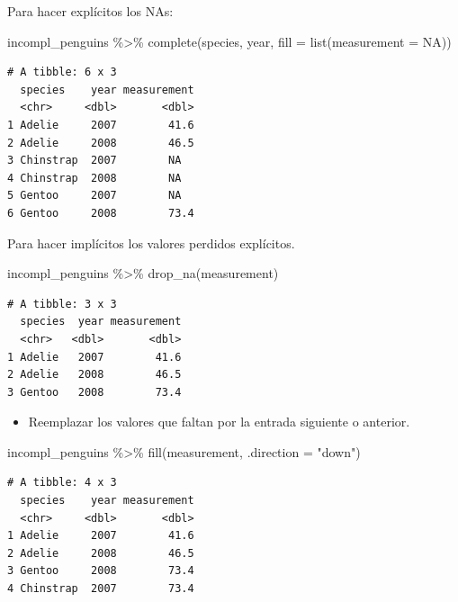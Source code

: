\documentclass[
  letterpaper,
  DIV=11,
  numbers=noendperiod]{scrreprt}
\newenvironment{Shaded}{\begin{snugshade}}{\end{snugshade}}
\newcommand{\AttributeTok}[1]{\textcolor[rgb]{0.40,0.45,0.13}{#1}}
\newcommand{\ConstantTok}[1]{\textcolor[rgb]{0.56,0.35,0.01}{#1}}
\newcommand{\FunctionTok}[1]{\textcolor[rgb]{0.28,0.35,0.67}{#1}}
\newcommand{\NormalTok}[1]{\textcolor[rgb]{0.00,0.23,0.31}{#1}}
\newcommand{\SpecialCharTok}[1]{\textcolor[rgb]{0.37,0.37,0.37}{#1}}
\newcommand{\StringTok}[1]{\textcolor[rgb]{0.13,0.47,0.30}{#1}}
\providecommand{\tightlist}{%
  \setlength{\itemsep}{0pt}\setlength{\parskip}{0pt}}\usepackage{longtable,booktabs,array}
\begin{document}
Para hacer explícitos los NAs:

\begin{Shaded}
\begin{Highlighting}[]
\NormalTok{incompl\_penguins }\SpecialCharTok{\%\textgreater{}\%} 
  \FunctionTok{complete}\NormalTok{(species, year, }\AttributeTok{fill =} \FunctionTok{list}\NormalTok{(}\AttributeTok{measurement =} \ConstantTok{NA}\NormalTok{))}
\end{Highlighting}
\end{Shaded}

\begin{verbatim}
# A tibble: 6 x 3
  species    year measurement
  <chr>     <dbl>       <dbl>
1 Adelie     2007        41.6
2 Adelie     2008        46.5
3 Chinstrap  2007        NA  
4 Chinstrap  2008        NA  
5 Gentoo     2007        NA  
6 Gentoo     2008        73.4
\end{verbatim}

Para hacer implícitos los valores perdidos explícitos.

\begin{Shaded}
\begin{Highlighting}[]
\NormalTok{incompl\_penguins }\SpecialCharTok{\%\textgreater{}\%} 
  \FunctionTok{drop\_na}\NormalTok{(measurement)}
\end{Highlighting}
\end{Shaded}

\begin{verbatim}
# A tibble: 3 x 3
  species  year measurement
  <chr>   <dbl>       <dbl>
1 Adelie   2007        41.6
2 Adelie   2008        46.5
3 Gentoo   2008        73.4
\end{verbatim}

\begin{itemize}
\tightlist
\item
  Reemplazar los valores que faltan por la entrada siguiente o anterior.
\end{itemize}

\begin{Shaded}
\begin{Highlighting}[]
\NormalTok{incompl\_penguins }\SpecialCharTok{\%\textgreater{}\%} 
  \FunctionTok{fill}\NormalTok{(measurement, }\AttributeTok{.direction =} \StringTok{"down"}\NormalTok{)}
\end{Highlighting}
\end{Shaded}

\begin{verbatim}
# A tibble: 4 x 3
  species    year measurement
  <chr>     <dbl>       <dbl>
1 Adelie     2007        41.6
2 Adelie     2008        46.5
3 Gentoo     2008        73.4
4 Chinstrap  2007        73.4
\end{verbatim}
\end{document}
